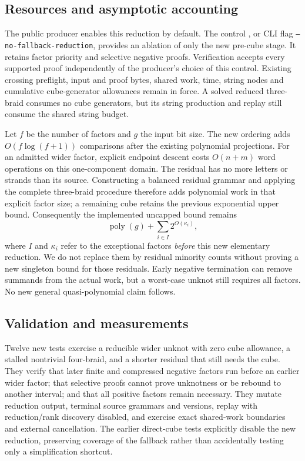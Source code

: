 \subsection{Resources and asymptotic accounting}

The public producer enables this reduction by default. The control
, or CLI flag
\texttt{--no-fallback-reduction}, provides an ablation of only the new
pre-cube stage. It retains factor priority and selective negative proofs.
Verification accepts every supported proof independently of the producer's
choice of this control. Existing crossing preflight, input and proof bytes,
shared work, time, string nodes and cumulative cube-generator allowances
remain in force. A solved reduced three-braid consumes no cube generators,
but its string production and replay still consume the shared string budget.

Let $f$ be the number of factors and $g$ the input bit size. The new ordering
adds $O(f\log(f+1))$ comparisons after the existing polynomial projections.
For an admitted wider factor, explicit endpoint descent costs $O(n+m)$ word
operations on this one-component domain. The residual has no more letters or
strands than its source. Constructing a balanced residual grammar and applying
the complete three-braid procedure therefore adds polynomial work in that
explicit factor size; a remaining cube retains the previous exponential upper
bound. Consequently the implemented uncapped bound remains
\[
 \operatorname{poly}(g)+\sum_{i\in I}2^{O(\kappa_i)},
\]
where $I$ and $\kappa_i$ refer to the exceptional factors \emph{before} this
new elementary reduction. We do not replace them by residual minority counts
without proving a new singleton bound for those residuals. Early negative
termination can remove summands from the actual work, but a worst-case unknot
still requires all factors. No new general quasi-polynomial claim follows.

\subsection{Validation and measurements}

Twelve new tests exercise a reducible wider unknot with zero cube allowance,
a stalled nontrivial four-braid, and a shorter residual that still needs the
cube. They verify that later finite and compressed negative factors run before
an earlier wider factor; that selective proofs cannot prove unknotness or be
rebound to another interval; and that all positive factors remain necessary.
They mutate reduction output, terminal source grammars and versions, replay
with reduction/rank discovery disabled, and exercise exact shared-work
boundaries and external cancellation. The earlier direct-cube tests explicitly
disable the new reduction, preserving coverage of the fallback rather than
accidentally testing only a simplification shortcut.

